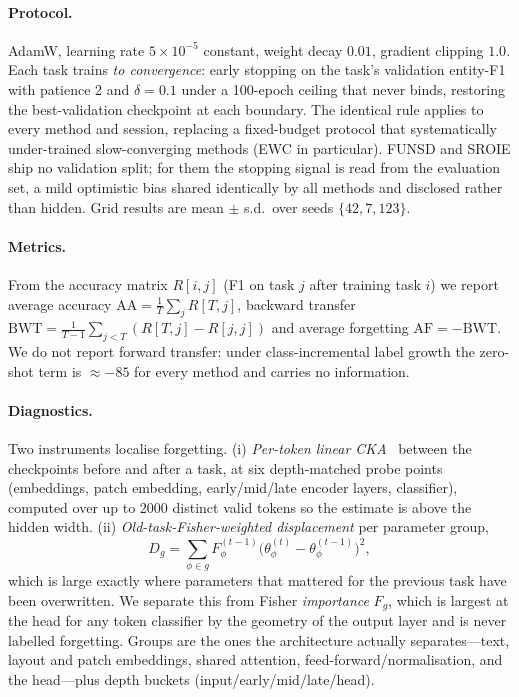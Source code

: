 \documentclass{article}
\begin{document}
\paragraph{Protocol.} AdamW, learning rate $5\times10^{-5}$ constant, weight decay $0.01$, gradient clipping $1.0$. Each task trains \emph{to convergence}: early stopping on the task's validation entity-F1 with patience 2 and $\delta{=}0.1$ under a 100-epoch ceiling that never binds, restoring the best-validation checkpoint at each boundary. The identical rule applies to every method and session, replacing a fixed-budget protocol that systematically under-trained slow-converging methods (EWC in particular). FUNSD and SROIE ship no validation split; for them the stopping signal is read from the evaluation set, a mild optimistic bias shared identically by all methods and disclosed rather than hidden. Grid results are mean $\pm$ s.d.\ over seeds $\{42,7,123\}$.

\paragraph{Metrics.} From the accuracy matrix $R[i,j]$ (F1 on task $j$ after training task $i$) we report average accuracy $\mathrm{AA}=\frac{1}{T}\sum_j R[T,j]$, backward transfer $\mathrm{BWT}=\frac{1}{T-1}\sum_{j<T}(R[T,j]-R[j,j])$ and average forgetting $\mathrm{AF}=-\mathrm{BWT}$. We do not report forward transfer: under class-incremental label growth the zero-shot term is $\approx-85$ for every method and carries no information.

\paragraph{Diagnostics.} Two instruments localise forgetting. (i) \emph{Per-token linear CKA}~\citep{kornblith2019similarity} between the checkpoints before and after a task, at six depth-matched probe points (embeddings, patch embedding, early/mid/late encoder layers, classifier), computed over up to 2000 distinct valid tokens so the estimate is above the hidden width. (ii) \emph{Old-task-Fisher-weighted displacement} per parameter group,
\begin{equation}
  D_g=\sum_{\phi\in g} F^{(t-1)}_\phi\bigl(\theta^{(t)}_\phi-\theta^{(t-1)}_\phi\bigr)^2 ,
\end{equation}
which is large exactly where parameters that mattered for the previous task have been overwritten. We separate this from Fisher \emph{importance} $F_g$, which is largest at the head for any token classifier by the geometry of the output layer and is never labelled forgetting. Groups are the ones the architecture actually separates---text, layout and patch embeddings, shared attention, feed-forward/normalisation, and the head---plus depth buckets (input/early/mid/late/head).
\end{document}
